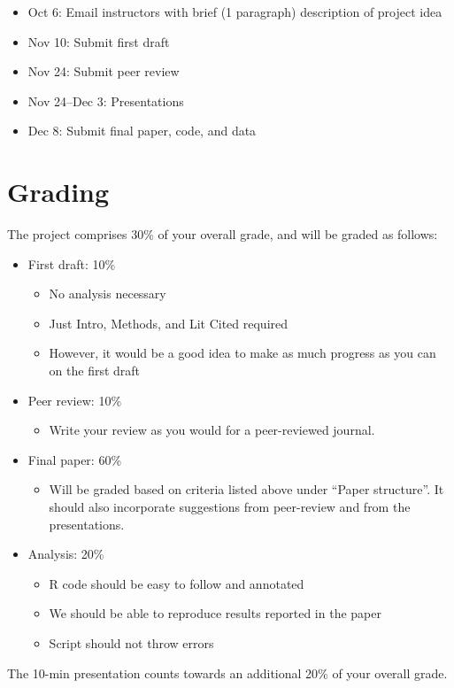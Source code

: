 \documentclass[12pt]{article}
\begin{document}
\begin{itemize}
  \item Oct 6: Email instructors with brief (1 paragraph) description
    of project idea
  \item Nov 10: Submit first draft
  \item Nov 24: Submit peer review
  \item Nov 24--Dec 3: Presentations
  \item Dec 8: Submit final paper, code, and data
\end{itemize}


\section*{Grading}

The project comprises 30\% of your overall grade, and will be graded as follows:

\begin{itemize}
  \item First draft: 10\%
    \begin{itemize}
      \item No analysis necessary
      \item Just Intro, Methods, and Lit Cited required
      \item However, it would be a good idea to make as much progress
        as you can on the first draft
    \end{itemize}
  \item Peer review: 10\%
    \begin{itemize}
      \item Write your review as you would for a peer-reviewed journal.
    \end{itemize}
  \item Final paper: 60\%
    \begin{itemize}
      \item Will be graded based on criteria listed above under
        ``Paper structure''. It should also incorporate suggestions from
        peer-review and from the presentations.
    \end{itemize}
  \item Analysis: 20\%
    \begin{itemize}
      \item R code should be easy to follow and annotated
      \item We should be able to reproduce results reported in the paper
      \item Script should not throw errors
    \end{itemize}
\end{itemize}

The 10-min presentation counts towards an additional 20\% of your
overall grade.
\end{document}
